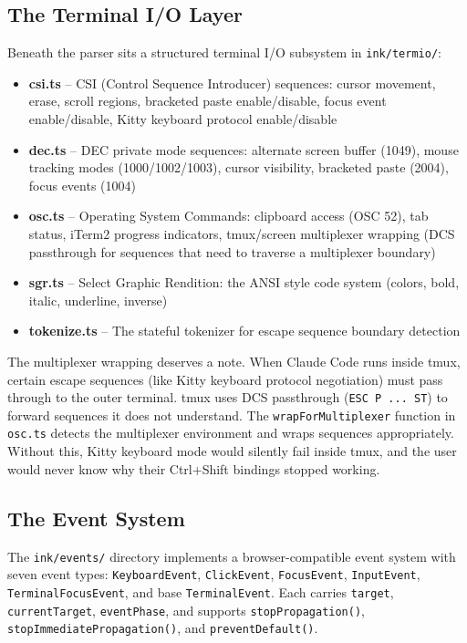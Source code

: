 \documentclass[
  english,
  11pt,
  letterpaper,
]{book}
\providecommand{\tightlist}{%
  \setlength{\itemsep}{0pt}\setlength{\parskip}{0pt}}
\begin{document}
\subsection{The Terminal I/O Layer}\label{the-terminal-io-layer}

Beneath the parser sits a structured terminal I/O subsystem in
\texttt{ink/termio/}:

\begin{itemize}
\tightlist
\item
  \textbf{csi.ts} -- CSI (Control Sequence Introducer) sequences: cursor
  movement, erase, scroll regions, bracketed paste enable/disable, focus
  event enable/disable, Kitty keyboard protocol enable/disable
\item
  \textbf{dec.ts} -- DEC private mode sequences: alternate screen buffer
  (1049), mouse tracking modes (1000/1002/1003), cursor visibility,
  bracketed paste (2004), focus events (1004)
\item
  \textbf{osc.ts} -- Operating System Commands: clipboard access (OSC
  52), tab status, iTerm2 progress indicators, tmux/screen multiplexer
  wrapping (DCS passthrough for sequences that need to traverse a
  multiplexer boundary)
\item
  \textbf{sgr.ts} -- Select Graphic Rendition: the ANSI style code
  system (colors, bold, italic, underline, inverse)
\item
  \textbf{tokenize.ts} -- The stateful tokenizer for escape sequence
  boundary detection
\end{itemize}

The multiplexer wrapping deserves a note. When Claude Code runs inside
tmux, certain escape sequences (like Kitty keyboard protocol
negotiation) must pass through to the outer terminal. tmux uses DCS
passthrough (\texttt{ESC\ P\ ...\ ST}) to forward sequences it does not
understand. The \texttt{wrapForMultiplexer} function in \texttt{osc.ts}
detects the multiplexer environment and wraps sequences appropriately.
Without this, Kitty keyboard mode would silently fail inside tmux, and
the user would never know why their Ctrl+Shift bindings stopped working.

\subsection{The Event System}\label{the-event-system}

The \texttt{ink/events/} directory implements a browser-compatible event
system with seven event types: \texttt{KeyboardEvent},
\texttt{ClickEvent}, \texttt{FocusEvent}, \texttt{InputEvent},
\texttt{TerminalFocusEvent}, and base \texttt{TerminalEvent}. Each
carries \texttt{target}, \texttt{currentTarget}, \texttt{eventPhase},
and supports \texttt{stopPropagation()},
\texttt{stopImmediatePropagation()}, and \texttt{preventDefault()}.
\end{document}
